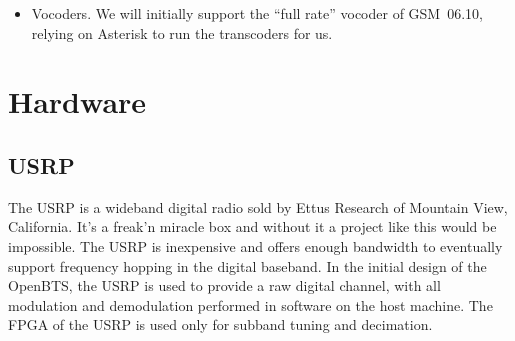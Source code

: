 \documentclass[11pt]{book}
\begin{document}
\begin{itemize}
\footnote{The implication here is that the Paging Response \emph{implies} a connection mode service request as well.  This is why the message includes a classmark element.} 
	\begin{itemize}
		\item Paging Request Type 1 (RR, 9.1.22), encode.  This message is sent whenever a SIP INVITE message arrives from Asterisk.  Because we are not yet supporting TMSIs, we have no use for the other Paging Request formats.
		\item Paging Response (RR, 9.1.25), decode.
		\item Setup (CC, 9.3.23), encode.  This message carries the content of the SIP INVITE message to the phone.
		\item Call Confirmed (CC, 9.3.2), decode.
		\item Assignment Command (RR, 9.1.2), encode.
		\item Assignment Complete (RR, 9.1.3), decode.
		\item Alerting (CC, 9.3.1), decode.
		\item Progress (CC, 9.3.17), encode.
		\item Connect (CC, 9.3.5), decode.
		\item Connect Acknowledge (CC, 9.3.6), encode.
	\end{itemize}
	\item Vocoders.  We will initially support the ``full rate'' vocoder of GSM~06.10, relying on Asterisk to run the transcoders for us.
\end{itemize}



\section{Hardware}

\subsection{USRP}
The USRP is a wideband digital radio sold by Ettus Research of Mountain View, California.  It's a freak'n miracle box and without it a project like this would be impossible.  The USRP is inexpensive and offers enough bandwidth to eventually support frequency hopping in the digital baseband.  In the initial design of the OpenBTS, the USRP is used to provide a raw digital channel, with all modulation and demodulation performed in software on the host machine.  The FPGA of the USRP is used only for subband tuning and decimation.
\end{document}
